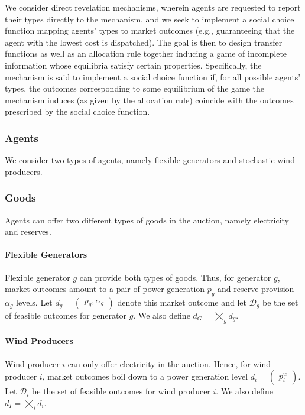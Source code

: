 \documentclass{article}
\begin{document}
We consider direct revelation mechanisms, wherein agents are requested to report their types directly to the mechanism, and we seek to implement a social choice function mapping agents' types to market outcomes (e.g., guaranteeing that the agent with the lowest cost is dispatched). The goal is then to design transfer functions as well as an allocation rule together inducing a game of incomplete information whose equilibria satisfy certain properties. Specifically, the mechanism is said to implement a social choice function if, for all possible agents' types, the outcomes corresponding to some equilibrium of the game the mechanism induces (as given by the allocation rule) coincide with the outcomes prescribed by the social choice function.

\subsubsection{Agents}

We consider two types of agents, namely flexible generators and stochastic wind producers.

\subsubsection{Goods}

Agents can offer two different types of goods in the auction, namely electricity and reserves.

\paragraph{Flexible Generators} Flexible generator $g$ can provide both types of goods. Thus, for generator $g$, market outcomes amount to a pair of power generation $p_g$ and reserve provision $\alpha_g$ levels. Let $d_g = \begin{pmatrix} p_g, \alpha_g \end{pmatrix}$ denote this market outcome and let $\mathcal{D}_g$ be the set of feasible outcomes for generator $g$. We also define $d_G = \bigtimes_g d_g$.

\paragraph{Wind Producers} Wind producer $i$ can only offer electricity in the auction. Hence, for wind producer $i$, market outcomes boil down to a power generation level $d_i = \begin{pmatrix} p_i^w \end{pmatrix}$. Let $\mathcal{D}_i$ be the set of feasible outcomes for wind producer $i$. We also define $d_I = \bigtimes_i d_i$.
\end{document}
